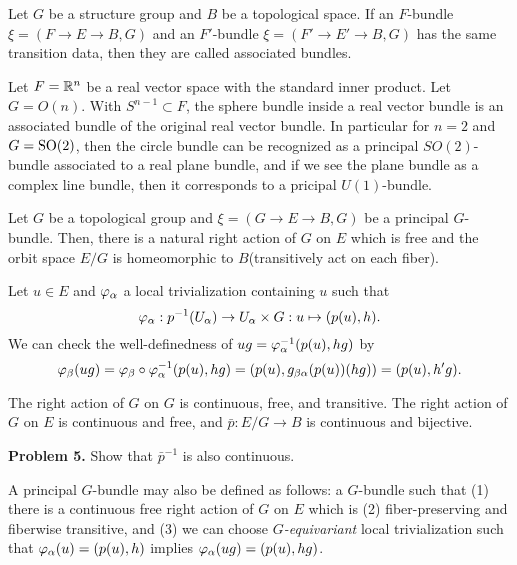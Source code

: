 \documentclass{../../small}
\begin{document}
\begin{defn}
Let $G$ be a structure group and $B$ be a topological space.
If an $F$-bundle $\xi=(F\to E\to B,G)$ and an $F'$-bundle $\xi=(F'\to E'\to B,G)$ has the same transition data, then they are called associated bundles.
\end{defn}


\begin{ex*}
Let $F=\mathbb{R}^n$ be a real vector space with the standard inner product.
Let $G=O(n)$.
With $S^{n-1}\subset F$, the sphere bundle inside a real vector bundle is an associated bundle of the original real vector bundle.
In particular for $n=2$ and $G=\mathrm{SO}(2)$, then the circle bundle can be recognized as a principal $SO(2)$-bundle associated to a real plane bundle, and if we see the plane bundle as a complex line bundle, then it corresponds to a pricipal $U(1)$-bundle.
\end{ex*}

\begin{prop}
Let $G$ be a topological group and $\xi=(G\to E\to B,G)$ be a principal $G$-bundle.
Then, there is a natural right action of $G$ on $E$ which is free and the orbit space $E/G$ is homeomorphic to $B$(transitively act on each fiber).
\end{prop}
\begin{pf}
Let $u\in E$ and $\varphi_\alpha$ a local trivialization containing $u$ such that
\[\varphi_\alpha:p^{-1}(U_\alpha)\to U_\alpha\times G:u\mapsto(p(u),h).\]
We can check the well-definedness of $ug=\varphi_\alpha^{-1}(p(u),hg)$ by
\[\varphi_\beta(ug)=\varphi_\beta\circ\varphi_\alpha^{-1}(p(u),hg)=(p(u),g_{\beta\alpha}(p(u))(hg))=(p(u),h'g).\]

The right action of $G$ on $G$ is continuous, free, and transitive.
The right action of $G$ on $E$ is continuous and free, and $\bar p:E/G\to B$ is continuous and bijective.
\end{pf}

\textbf{Problem 5.} Show that $\bar{p}^{-1}$ is also continuous.

\begin{rmk*}
A principal $G$-bundle may also be defined as follows: a $G$-bundle such that (1) there is a continuous free right action of $G$ on $E$ which is (2) fiber-preserving and fiberwise transitive, and (3) we can choose \emph{$G$-equivariant} local trivialization such that $\varphi_\alpha(u)=(p(u),h)$ implies $\varphi_\alpha(ug)=(p(u),hg)$.

\end{rmk*}
\end{document}
